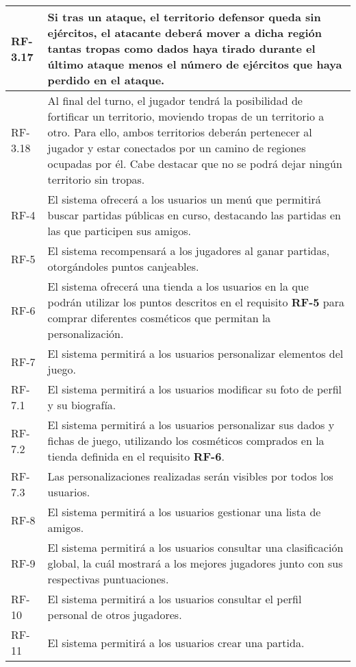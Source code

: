 \documentclass[11pt, a4paper, titlepage]{article}
\begin{document}
\begin{longtable}[h!]{| p{} | p{} |}
         RF-3.17 & Si tras un ataque, el territorio defensor queda sin ejércitos, el atacante deberá mover a dicha región tantas tropas como dados haya tirado durante el último ataque menos el número de ejércitos que haya perdido en el ataque. \\
         \hline
         RF-3.18 & Al final del turno, el jugador tendrá la posibilidad de fortificar un territorio, moviendo tropas de un territorio a otro. Para ello, ambos territorios deberán pertenecer al jugador y estar conectados por un camino de regiones ocupadas por él. Cabe destacar que no se podrá dejar ningún territorio sin tropas.\\
         \hline
         RF-4 & El sistema ofrecerá a los usuarios un menú que permitirá buscar partidas públicas en curso, destacando las partidas en las que participen sus amigos.\\
         \hline
         RF-5 & El sistema recompensará a los jugadores al ganar partidas, otorgándoles puntos canjeables.\\
         \hline
         RF-6 & El sistema ofrecerá una tienda a los usuarios en la que podrán utilizar los puntos descritos en el requisito \textbf{RF-5} para comprar diferentes cosméticos que permitan la personalización. \\
         \hline
         RF-7 & El sistema permitirá a los usuarios personalizar elementos del juego.\\
         \hline
         RF-7.1 & El sistema permitirá a los usuarios modificar su foto de perfil y su biografía.\\
         \hline
         RF-7.2 & El sistema permitirá a los usuarios personalizar sus dados y fichas de juego, utilizando los cosméticos comprados en la tienda definida en el requisito \textbf{RF-6}.\\
         \hline
         RF-7.3 & Las personalizaciones realizadas serán visibles por todos los usuarios.\\
         \hline
         RF-8 & El sistema permitirá a los usuarios gestionar una lista de amigos.\\
         \hline
         RF-9 & El sistema permitirá a los usuarios consultar una clasificación global, la cuál mostrará a los mejores jugadores junto con sus respectivas puntuaciones.\\
         \hline
         RF-10 & El sistema permitirá a los usuarios consultar el perfil personal de otros jugadores.\\
         \hline
         RF-11 & El sistema permitirá a los usuarios crear una partida.\\

\end{longtable}
\end{document}
